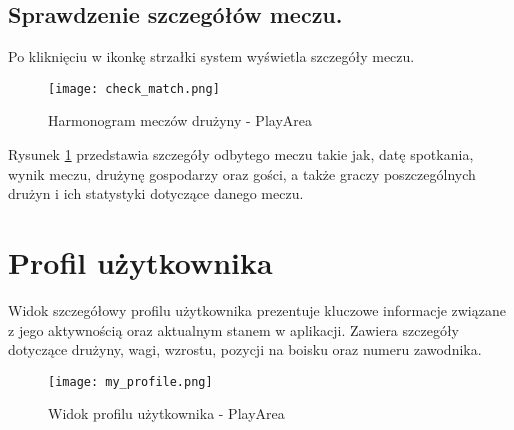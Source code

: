\documentclass[wmii,inf,inz]{uwmthesis} %
\begin{document}
\subsection{Sprawdzenie szczegółów meczu.}
Po kliknięciu w ikonkę strzałki system wyświetla szczegóły meczu.

\begin{figure}[H]
    \centering
    \texttt{[image: check\_match.png]}
    \caption{Harmonogram meczów drużyny - PlayArea}
    \label{fig:check_match}
\end{figure}

\noindent
Rysunek \ref{fig:check_match} przedstawia szczegóły odbytego meczu takie jak, datę spotkania, wynik meczu, drużynę gospodarzy oraz gości, a także graczy poszczególnych drużyn i ich statystyki dotyczące danego meczu.

\section{Profil użytkownika}

Widok szczegółowy profilu użytkownika prezentuje kluczowe informacje związane z jego aktywnością oraz aktualnym stanem w aplikacji. Zawiera szczegóły dotyczące drużyny, wagi, wzrostu, pozycji na boisku oraz numeru zawodnika.

\begin{figure}[H]
    \centering
    \texttt{[image: my\_profile.png]}
    \caption{Widok profilu użytkownika - PlayArea}
    \label{fig:profile_view}
\end{figure}
\end{document}
